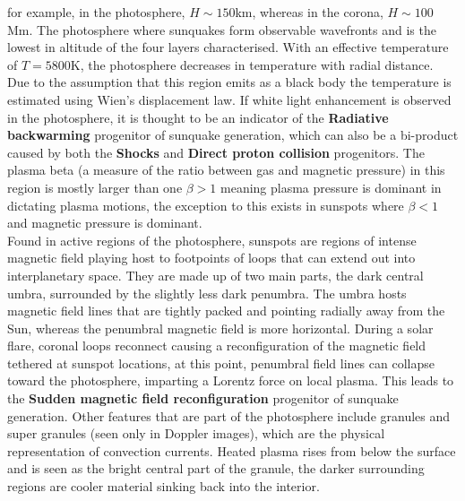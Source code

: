 for example, in the photosphere, $H\sim150$km, whereas in the corona, $H\sim100$Mm. The photosphere where sunquakes form observable wavefronts and is the lowest in altitude of the four layers characterised. With an effective temperature of $T=5800$K, the photosphere decreases in temperature with radial distance. Due to the assumption that this region emits as a black body the temperature is estimated using Wien's displacement law. If white light enhancement is observed in the photosphere, it is thought to be an indicator of the \textbf{Radiative backwarming} progenitor of sunquake generation, which can also be a bi-product caused by both the \textbf{Shocks} and \textbf{Direct proton collision} progenitors. The plasma beta (a measure of the ratio between gas and magnetic pressure) in this region is mostly larger than one $\beta >1$ meaning plasma pressure is dominant in dictating plasma motions, the exception to this exists in sunspots where $\beta<1$ and magnetic pressure is dominant. \\ 

Found in active regions of the photosphere, sunspots are regions of intense magnetic field playing host to footpoints of loops that can extend out into interplanetary space. They are made up of two main parts, the dark central umbra, surrounded by the slightly less dark penumbra. The umbra hosts magnetic field lines that are tightly packed and pointing radially away from the Sun, whereas the penumbral magnetic field is more horizontal. During a solar flare, coronal loops reconnect causing a reconfiguration of the magnetic field tethered at sunspot locations, at this point, penumbral field lines can collapse toward the photosphere, imparting a Lorentz force on local plasma. This leads to the \textbf{Sudden magnetic field reconfiguration} progenitor of sunquake generation. Other features that are part of the photosphere include granules and super granules (seen only in Doppler images), which are the physical representation of convection currents. Heated plasma rises from below the surface and is seen as the bright central part of the granule, the darker surrounding regions are cooler material sinking back into the interior. \\

